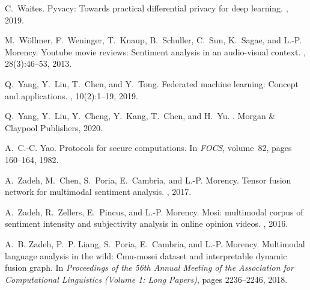 \documentclass[11pt]{article}
\begin{document}
\begin{thebibliography}{10}
C.~Waites.
\newblock Pyvacy: Towards practical differential privacy for deep learning.
, 2019.

M.~W{\"o}llmer, F.~Weninger, T.~Knaup, B.~Schuller, C.~Sun, K.~Sagae, and L.-P.
  Morency.
\newblock Youtube movie reviews: Sentiment analysis in an audio-visual context.
, 28(3):46--53, 2013.

Q.~Yang, Y.~Liu, T.~Chen, and Y.~Tong.
\newblock Federated machine learning: Concept and applications.
,
  10(2):1--19, 2019.

Q.~Yang, Y.~Liu, Y.~Cheng, Y.~Kang, T.~Chen, and H.~Yu.
.
\newblock Morgan \& Claypool Publishers, 2020.

A.~C.-C. Yao.
\newblock Protocols for secure computations.
\newblock In {\em FOCS}, volume~82, pages 160--164, 1982.

A.~Zadeh, M.~Chen, S.~Poria, E.~Cambria, and L.-P. Morency.
\newblock Tensor fusion network for multimodal sentiment analysis.
, 2017.

A.~Zadeh, R.~Zellers, E.~Pincus, and L.-P. Morency.
\newblock Mosi: multimodal corpus of sentiment intensity and subjectivity
  analysis in online opinion videos.
, 2016.

A.~B. Zadeh, P.~P. Liang, S.~Poria, E.~Cambria, and L.-P. Morency.
\newblock Multimodal language analysis in the wild: Cmu-mosei dataset and
  interpretable dynamic fusion graph.
\newblock In {\em Proceedings of the 56th Annual Meeting of the Association for
  Computational Linguistics (Volume 1: Long Papers)}, pages 2236--2246, 2018.

\end{thebibliography}
\end{document}
